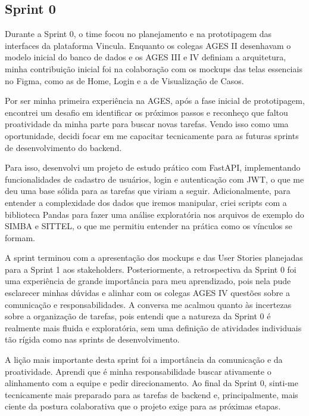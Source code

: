 \subsection{Sprint 0}

Durante a Sprint 0, o time focou no planejamento e na prototipagem das interfaces da plataforma Vincula. Enquanto os colegas AGES II desenhavam o modelo inicial do banco de dados e os AGES III e IV definiam a arquitetura, minha contribuição inicial foi na colaboração com os mockups das telas essenciais no Figma\cite{figma}, como as de Home, Login e a de Visualização de Casos.

Por ser minha primeira experiência na AGES, após a fase inicial de prototipagem, encontrei um desafio em identificar os próximos passos e reconheço que faltou proatividade da minha parte para buscar novas tarefas. Vendo isso como uma oportunidade, decidi focar em me capacitar tecnicamente para as futuras sprints de desenvolvimento do backend.

Para isso, desenvolvi um projeto de estudo prático com FastAPI\cite{fastapi}, implementando funcionalidades de cadastro de usuários, login e autenticação com JWT, o que me deu uma base sólida para as tarefas que viriam a seguir. Adicionalmente, para entender a complexidade dos dados que iremos manipular, criei scripts com a biblioteca Pandas\cite{pandas} para fazer uma análise exploratória nos arquivos de exemplo do SIMBA e SITTEL, o que me permitiu entender na prática como os vínculos se formam.

A sprint terminou com a apresentação dos mockups e das User Stories planejadas para a Sprint 1 aos stakeholders. Posteriormente, a retrospectiva da Sprint 0 foi uma experiência de grande importância para meu aprendizado, pois nela pude esclarecer minhas dúvidas e alinhar com os colegas AGES IV questões sobre a comunicação e responsabilidades. A conversa me acalmou quanto às incertezas sobre a organização de tarefas, pois entendi que a natureza da Sprint 0 é realmente mais fluida e exploratória, sem uma definição de atividades individuais tão rígida como nas sprints de desenvolvimento.

A lição mais importante desta sprint foi a importância da comunicação e da proatividade. Aprendi que é minha responsabilidade buscar ativamente o alinhamento com a equipe e pedir direcionamento. Ao final da Sprint 0, sinti-me tecnicamente mais preparado para as tarefas de backend e, principalmente, mais ciente da postura colaborativa que o projeto exige para as próximas etapas.